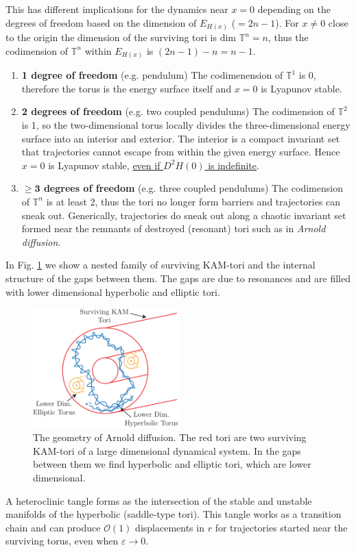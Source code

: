This has different implications for the dynamics near $x=0$ depending on the degrees of freedom based on the dimension of $E_{H(x)}$ ($=2n-1$). For $x\neq 0$ close to the origin the dimension of the surviving tori is $ \textrm{dim }\mathbb{T}^{n}=n$, thus the codimension of $\mathbb{T}^{n}$ within $E_{H(x)}$ is $(2n-1)-n = n-1$.
\begin{enumerate}
	\item  \textbf{1 degree of freedom} (e.g. pendulum) The codimenension of $\mathbb{T}^{1}$ is 0, therefore the torus is the energy surface itself and $x=0$ is Lyapunov stable. 
	\item \textbf{2 degrees of freedom} (e.g. two coupled pendulums) The codimension of $\mathbb{T}^{2}$ is 1, so the two-dimensional torus locally divides the three-dimensional energy surface into an interior and exterior. The interior is a compact invariant set that trajectories cannot escape from within the given energy surface. Hence $x=0$ is Lyapunov stable, \underline{even if $D^{2}H(0)$ is indefinite}.
	\item \textbf{$\bm{\geq 3}$ degrees of freedom} (e.g. three coupled pendulums) The codimension of $\mathbb{T}^{n}$ is at least 2, thus the tori no longer form barriers and trajectories can sneak out. Generically, trajectories do sneak out along a chaotic invariant set formed near the remnants of destroyed (resonant) tori such as in \emph{Arnold diffusion}.
\end{enumerate}

In Fig. \ref{fig:arnold-diffusion} we show a nested family of surviving KAM-tori and the internal structure of the gaps between them. The gaps are due to resonances and are filled with lower dimensional hyperbolic and elliptic tori. 
\begin{figure}[h!]
	\centering
	\includegraphics[width=0.5\textwidth]{figures/ch8/22arnold_diffusion.pdf}
	\caption{The geometry of Arnold diffusion. The red tori are two surviving KAM-tori of a large dimensional dynamical system. In the gaps between them we find hyperbolic and elliptic tori, which  are lower dimensional. }
	\label{fig:arnold-diffusion}
\end{figure}
A heteroclinic tangle forms as the intersection of the stable and unstable manifolds of the hyperbolic (saddle-type tori). This tangle works as a transition chain and can produce $\mathcal{O}(1)$ displacements in $r$ for trajectories started near the surviving torus, even when $\varepsilon \to 0$. 

